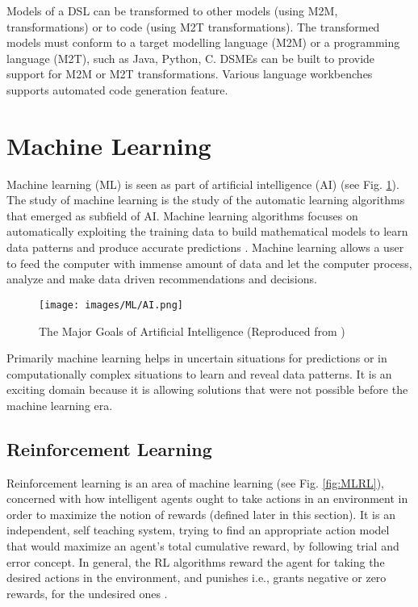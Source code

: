 \documentclass[11pt,letterpaper]{ryersonSGSThesis}
\begin{document}
\begin{ryersonSGSThesis}
    Models of a DSL can be transformed to other models (using M2M, transformations) or to code (using M2T transformations). The transformed models must conform to a target modelling language (M2M) or a programming language (M2T), such as Java, Python, C. DSMEs can be built to provide support for M2M or M2T transformations. Various language workbenches supports automated code generation feature.
    
    \section{Machine Learning}
        Machine learning \cite{Jiang2021} (ML) is seen as part of artificial intelligence (AI) (see Fig. \ref{fig:AI}). The study of machine learning is the study of the automatic learning algorithms that emerged as subfield of AI. Machine learning algorithms focuses on automatically exploiting the training data to build mathematical models to learn data patterns and produce accurate predictions \cite{Jiang2021}. Machine learning allows a user to feed the computer with immense amount of data and let the computer process, analyze and make data driven recommendations and decisions.
        
        \begin{figure}[!tbh]
            \centering
            \texttt{[image: images/ML/AI.png]}
            \caption{The Major Goals of Artificial Intelligence (Reproduced from \cite{Nian2020})}
            \label{fig:AI}
        \end{figure}
        
        Primarily machine learning helps in uncertain situations for predictions or in computationally complex situations to learn and reveal data patterns. It is an exciting domain because it is allowing solutions that were not possible before the machine learning era. 
        
        \subsection{Reinforcement Learning} 
            Reinforcement learning is an area of machine learning (see Fig. \ref{fig:MLRL}), concerned with how intelligent agents ought to take actions in an environment in order to maximize the notion of rewards (defined later in this section). It is an independent, self teaching system, trying to find an appropriate action model that would maximize an agent’s total cumulative reward, by following trial and error concept. In general, the RL algorithms reward the agent for taking the desired actions in the environment, and punishes i.e., grants negative or zero rewards, for the undesired ones \cite{Brunton2019}. 
    

\end{ryersonSGSThesis}
\end{document}
